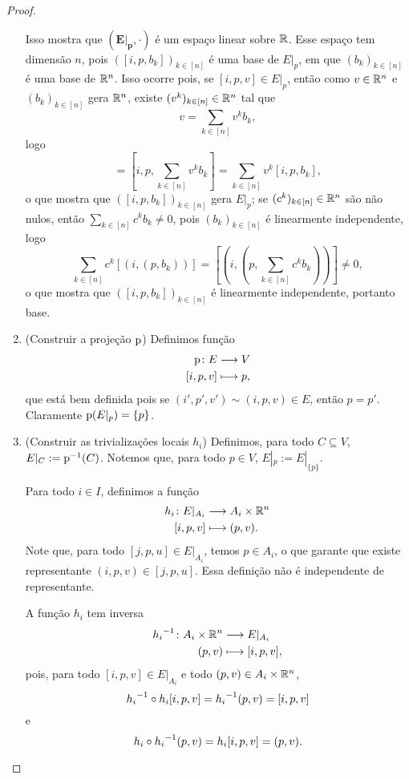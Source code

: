 \begin{proof}
\begin{enumerate}
Isso mostra que $(\bm{E|_p},\cdot)$ é um espaço linear sobre $\mathbb{R}$. Esse espaço tem dimensão $n$, pois $([i,p,b_k])_{k \in [n]}$ é uma base de $E|_p$, em que $(b_k)_{k \in [n]}$ é uma base de $\mathbb{R}^n$. Isso ocorre pois, se $[i,p,v] \in E|_p$, então como $v \in \mathbb{R}^n$ e $(b_k)_{k \in [n]}$ gera $\mathbb{R}^n$, existe $(v^k)_{k \in [n]} \in \mathbb{R}^n$ tal que
	\begin{equation*}
	v = \sum_{k \in [n]} v^k b_k,
	\end{equation*}
logo
	\begin{equation*}
	[i,p,v] = [i,p,\sum_{k \in [n]} v^k b_k] = \sum_{k \in [n]} v^k [i,p,b_k],
	\end{equation*}
o que mostra que $([i,p,b_k])_{k \in [n]}$ gera $E|_p$; se $(c^k)_{k \in [n]} \in \mathbb{R}^n$ são não nulos, então $\sum_{k \in [n]} c^k b_k \neq 0$, pois $(b_k)_{k \in [n]}$ é linearmente independente, logo
	\begin{equation*}
	\sum_{k \in [n]} c^k [(i,(p,b_k))] = [(i,(p,\sum_{k \in [n]} c^k b_k))] \neq 0,
	\end{equation*}
o que mostra que $([i,p,b_k])_{k \in [n]}$ é linearmente independente, portanto base.

\item (Construir a projeção $\mathrm{p}$) Definimos função
	\begin{align*}
	{\mathrm{p}}\colon {E} &\longrightarrow {V} \\{[i,p,v]} &\longmapsto p,
	\end{align*}
que está bem definida pois se $(i',p',v') \sim (i,p,v) \in E$, então $p=p'$.
Claramente $\mathrm{p}(E|_p) = \{p\}$.

\item (Construir as trivializações locais $h_i$) Definimos, para todo $C \subseteq V$, $E|_C := \mathrm{p}^{-1}(C)$. Notemos que, para todo $p \in V$, $E|_p := E|_{\{p\}}$.

Para todo $i \in I$, definimos a função
	\begin{align*}
	{h_i}\colon {E|_{A_i}} &\longrightarrow {A_i \times \mathbb{R}^n} \\{[i,p,v]} &\longmapsto (p,v).
	\end{align*}
Note que, para todo $[j,p,u] \in E|_{A_i}$, temos $p \in A_i$, o que garante que existe representante $(i,p,v) \in [j,p,u]$. Essa definição não é independente de representante.

A função $h_i$ tem inversa
	\begin{align*}
	{{h_i}^{-1}}\colon {A_i \times \mathbb{R}^n} &\longrightarrow {E|_{A_i}} \\{(p,v)} &\longmapsto [i,p,v],
	\end{align*}
pois, para todo $[i,p,v] \in E|_{A_i}$ e todo $(p,v) \in A_i \times \mathbb{R}^n$,
	\begin{equation*}
	{h_i}^{-1} \circ h_i [i,p,v] = {h_i}^{-1} (p,v) = [i,p,v]
	\end{equation*}
e
	\begin{equation*}
	h_i \circ {h_i}^{-1} (p,v) = h_i [i,p,v] = (p,v).
	\end{equation*}


\end{enumerate}
\end{proof}
